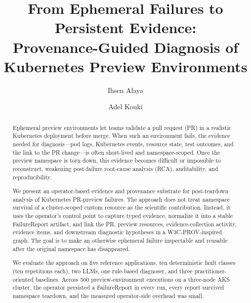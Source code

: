 \documentclass[sigconf, nonacm=true, anonymous=false, review=false]{acmart}
\newcommand{\fp}{FailureReport\xspace}
\begin{document}
\title{From Ephemeral Failures to Persistent Evidence:\\
       Provenance-Guided Diagnosis of Kubernetes Preview Environments}

\author{Ihsen Alaya}
\affiliation{%
  \institution{}
  \country{}
}

\author{Adel Kouki}
\affiliation{%
  \institution{}
  \country{}
}
\email{}


\begin{abstract}
Ephemeral preview environments let teams validate a pull request (PR) in a
realistic Kubernetes deployment before merge. When such an environment
fails, the evidence needed for diagnosis---pod logs, Kubernetes events,
resource state, test outcomes, and the link to the PR change---is often
short-lived and namespace-scoped. Once the preview namespace is torn down,
this evidence becomes difficult or impossible to reconstruct, weakening
post-failure root-cause analysis (RCA), auditability, and reproducibility.

We present an operator-based evidence and provenance substrate for
post-teardown analysis of Kubernetes PR-preview failures. The approach does
not treat namespace survival of a cluster-scoped custom resource as the
scientific contribution. Instead, it uses the operator's control point to
capture typed evidence, normalize it into a stable \fp{} artifact, and link
the PR, preview resources, evidence-collection activity, evidence items,
and downstream diagnostic hypotheses in a W3C-PROV-inspired graph. The goal
is to make an otherwise ephemeral failure inspectable and reusable after the
original namespace has disappeared.

We evaluate the approach on five reference applications, ten deterministic
fault classes (ten repetitions each), two LLMs, one rule-based diagnoser,
and three practitioner-oriented baselines. Across 500 preview-environment
executions on a three-node AKS cluster, the operator persisted a \fp{} in
every run, every report survived namespace teardown, and the measured
operator-side overhead was small.


\end{abstract}
\end{document}
